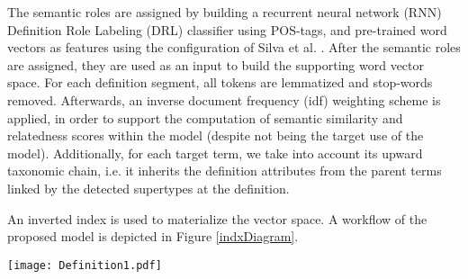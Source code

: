 \documentclass[11pt,a4paper]{article}
\begin{document}
The semantic roles are assigned by building a recurrent neural network (RNN) Definition Role Labeling (DRL) classifier using POS-tags, and pre-trained word vectors as features using the configuration of Silva et al. . After the semantic roles are assigned, they are used as an input to build the supporting word vector space. For each definition segment, all tokens are lemmatized and stop-words removed. Afterwards, an inverse document frequency (idf) weighting scheme is applied, in order to support the computation of semantic similarity and relatedness scores within the model (despite not being the target use of the model). Additionally, for each target term, we take into account its upward taxonomic chain, i.e. it inherits the definition attributes from the parent terms linked by the detected supertypes at the definition. 

An inverted index is used to materialize the vector space. A workflow of the proposed model is depicted in Figure \ref{indxDiagram}.

\begin{algorithm}
 	\caption{EDAM: Identifying discriminative attributes}
     \label{alg:comb}
    \begin{algorithmic}
          \IF{}
            \RETURN
          \ENDIF
        
          \IF{}
            \RETURN
          \ENDIF
        




    \end{algorithmic}
\end{algorithm}














\begin{figure*}[t]
	\centering
    \texttt{[image: Definition1.pdf]}
    \caption{Sparse vector space representation and explanation of each model component.}
    \label{indxDiagram}
\end{figure*}
\end{document}
